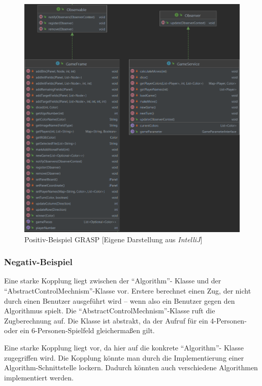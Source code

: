 \begin{figure}[htbp]
\centering
\centerline{\includegraphics[scale=.45]{grasp1}}
\caption{Positiv-Beispiel GRASP [Eigene Darstellung aus \emph{IntelliJ}]}
\label{fig:grasp1}
\end{figure}

\newpage
\subsubsection{Negativ-Beispiel}
\noindent Eine starke Kopplung liegt zwischen der \enquote{Algorithm}- Klasse und der \enquote{AbstractControl\-Mechnism}-Klasse vor. Erstere berechnet einen Zug, der nicht durch einen Benutzer ausgeführt wird -- wenn also ein Benutzer gegen den Algorithmus spielt. Die \enquote{AbstractControl\-Mechnism}-Klasse ruft die Zugberechnung auf. Die Klasse ist abstrakt, da der Aufruf für ein 4-Personen- oder ein 6-Personen-Spielfeld gleichermaßen gilt. 

Eine starke Kopplung liegt vor, da hier auf die konkrete \enquote{Algorithm}- Klasse zuge\-griffen wird. Die Kopplung könnte man durch die Implementierung einer Algorithm-Schnittstelle lockern. Dadurch könnten auch verschiedene Algorithmen implementiert werden.

